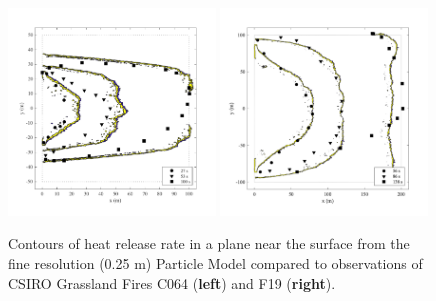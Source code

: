 \documentclass[atmosphere,article,accept,moreauthors,pdftex]{Definitions/mdpi}
\begin{document}
\begin{figure}[H]
\vspace{-18pt}
\widefigure
\includegraphics[width=0.49\textwidth]{figures/Case_C064_flame_position.pdf}
\includegraphics[width=0.49\textwidth]{figures/Case_F19_flame_position.pdf}
\vspace{-6pt}
\caption{Contours of heat release rate in a plane near the surface from the fine resolution (0.25 m) Particle Model compared to observations of CSIRO Grassland Fires C064 (\textbf{left}) and F19 (\textbf{right}).}
\label{fig:CaseF19_contours}
\end{figure}
\end{document}

